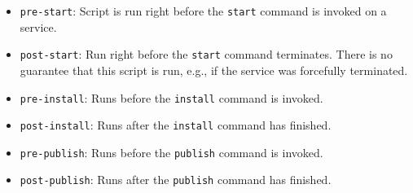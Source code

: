 \begin{itemize}

\item \verb!pre-start!: Script is run right before the \verb!start! command is
    invoked on a service.

\item \verb!post-start!: Run right before the \verb!start! command
    terminates. There is no guarantee that this script is run, e.g., if the
    service was forcefully terminated.

\item \verb!pre-install!: Runs before the \verb!install! command is invoked.

\item \verb!post-install!: Runs after the \verb!install! command has finished.

\item \verb!pre-publish!: Runs before the \verb!publish! command is invoked.

\item \verb!post-publish!: Runs after the \verb!publish! command has finished.

\end{itemize}
